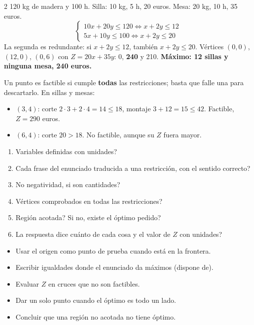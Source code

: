 \documentclass[10pt]{article}
\begin{document}
\begin{multicols}{2}
120 kg de madera y 100 h. Silla: 10 kg, 5 h, 20 euros. Mesa: 20 kg, 10 h, 35 euros.
\[\begin{cases}10x+20y\le120\iff x+2y\le12\\5x+10y\le100\iff x+2y\le20\end{cases}\]
La segunda es redundante: si \(x+2y\le12\), también \(x+2y\le20\). Vértices \((0,0)\), \((12,0)\), \((0,6)\) con \(Z=20x+35y\): 0, \textbf{240} y 210. \textbf{Máximo: 12 sillas y ninguna mesa, 240 euros.}

Un punto es factible si cumple \textbf{todas} las restricciones; basta que falle una para descartarlo. En sillas y mesas:
\begin{itemize}
  \item \((3,4)\): corte \(2\cdot3+2\cdot4=14\le18\), montaje \(3+12=15\le42\). Factible, \(Z=290\) euros.
  \item \((6,4)\): corte \(20>18\). No factible, aunque su \(Z\) fuera mayor.
\end{itemize}

\begin{enumerate}
  \item \textquestiondown{}Variables definidas con unidades?
  \item \textquestiondown{}Cada frase del enunciado traducida a una restricción, con el sentido correcto?
  \item \textquestiondown{}No negatividad, si son cantidades?
  \item \textquestiondown{}Vértices comprobados en todas las restricciones?
  \item \textquestiondown{}Región acotada? Si no, \textquestiondown{}existe el óptimo pedido?
  \item \textquestiondown{}La respuesta dice cuánto de cada cosa y el valor de \(Z\) con unidades?
\end{enumerate}

\begin{ojo}
\begin{itemize}
  \item Usar el origen como punto de prueba cuando está en la frontera.
  \item Escribir igualdades donde el enunciado da máximos (\guillemotleft{}dispone de\guillemotright{}).
  \item Evaluar \(Z\) en cruces que no son factibles.
  \item Dar un solo punto cuando el óptimo es todo un lado.
  \item Concluir que una región no acotada no tiene óptimo.
\end{itemize}
\end{ojo}

\end{multicols}
\end{document}

